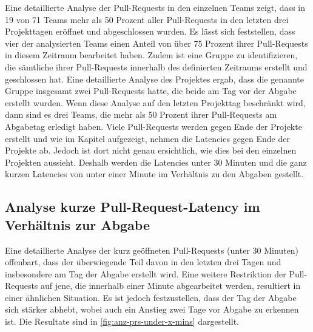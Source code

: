 Eine detaillierte Analyse der Pull-Requests in den einzelnen Teams zeigt, dass in 19 von 71 Teams mehr als 50 Prozent aller Pull-Requests in den letzten drei Projekttagen eröffnet und abgeschlossen wurden. Es lässt sich feststellen, dass vier der analysierten Teams einen Anteil von über 75 Prozent ihrer Pull-Requests in diesem Zeitraum bearbeitet haben. Zudem ist eine Gruppe zu identifizieren, die sämtliche ihrer Pull-Requests innerhalb des definierten Zeitraums erstellt und geschlossen hat. Eine detaillierte Analyse des Projektes ergab, dass die genannte Gruppe insgesamt zwei Pull-Requests hatte, die beide am Tag vor der Abgabe erstellt wurden. Wenn diese Analyse auf den letzten Projekttag beschränkt wird, dann sind es drei Teams, die mehr als 50 Prozent ihrer Pull-Requests am Abgabetag erledigt haben.
\newpage
Viele Pull-Requests werden gegen Ende der Projekte erstellt und wie im Kapitel  aufgezeigt, nehmen die Latencies gegen Ende der Projekte ab. Jedoch ist dort nicht genau ersichtlich, wie dies bei den einzelnen Projekten aussieht. Deshalb werden die Latencies unter 30 Minuten und die ganz kurzen Latencies von unter einer Minute im Verhältnis zu den Abgaben gestellt.

\subsection{Analyse kurze Pull-Request-Latency im Verhältnis zur Abgabe }
Eine detaillierte Analyse der kurz geöffneten Pull-Requests (unter 30 Minuten) offenbart, dass der überwiegende Teil davon in den letzten drei Tagen und insbesondere am Tag der Abgabe erstellt wird. Eine weitere Restriktion der Pull-Requests auf jene, die innerhalb einer Minute abgearbeitet werden, resultiert in einer ähnlichen Situation. Es ist jedoch festzustellen, dass der Tag der Abgabe sich stärker abhebt, wobei auch ein Anstieg zwei Tage vor Abgabe zu erkennen ist.  Die Resultate sind in \autoref{fig:anz-prs-under-x-mins} dargestellt.

